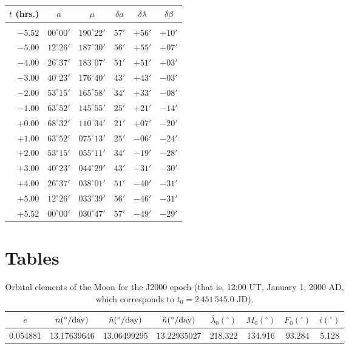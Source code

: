 \begin{center}
\begin{tabular}{r|ccccc}\centering
$t$ (hrs.) & $a $ & $\mu$ & $\delta a $ & $\delta\lambda $ & $\delta\beta$\\\hline
&&&\\[-1.75ex]
$-5.52$ & $00^\circ 00'$  & $190^\circ 22'$ & $57'$ &$+56'$ & $+10'$\\
$-5.00$ & $12^\circ 26'$ & $187^\circ 30'$ & $56'$ & $+55'$ & $+07'$\\
$-4.00$ & $26^\circ  37'$ & $183^\circ 07'$ & $51'$ & $+51'$&$+03'$\\
$-3.00$ & $40^\circ 23'$ & $176^\circ 40'$ & $43'$ &$+43'$ & $-03'$\\
$-2.00$ & $53^\circ 15'$ & $165^\circ 58'$ & $34'$ & $+33'$&$-08'$\\
$-1.00$ & $63^\circ 52'$ & $145^\circ 55'$ & $25'$ & $+21'$&$-14'$\\
$+0.00$ & $68^\circ 32'$ & $110^\circ 34'$ & $21'$ & $+07'$ & $-20'$\\
$+1.00$ & $63^\circ 52'$ & $075^\circ 13'$ & $25'$ & $-06'$&$-24'$\\
$+2.00$ & $53^\circ 15'$ & $055^\circ 11'$ & $34'$ & $-19'$&$-28'$\\
$+3.00$ & $40^\circ 23'$ & $044^\circ 29'$ & $43'$ & $-31'$&$-30'$\\
$+4.00$ & $26^\circ 37'$ & $038^\circ01'$ & $51'$ & $-40'$&$-31'$\\
$+5.00$& $12^\circ 26'$ & $033^\circ 39'$ & $56'$ & $- 46'$&$-31'$\\
$+5.52$ & $00^\circ 00'$ & $030^\circ 47'$ & $57'$ & $-49'$&$-29'$\\
\end{tabular}
\end{center}

\section{Tables}

\begin{table}[h]
{\small\centering
\begin{tabular}{cccccccc}
$e$ & $n(^\circ/{\rm day})$ &  $\tilde{n}(^\circ/{\rm day})$  & $\breve{n}(^\circ/{\rm day})$
& $ \bar{\lambda}_0(^\circ)$ & $M_0(^\circ)$ & $ F_0(^\circ)$ & $i(^\circ)$ \\\hline
0.054881 & 13.17639646 & 13.06499295& $13.22935027$ &
218.322 & 134.916 & 93.284& 5.128\\
\end{tabular}
\caption{Orbital elements of the Moon for the J2000 epoch (that is, 12:00 UT, January 1, 2000 AD,
which corresponds to $t_0 = 2\,451\,545.0$ JD).}\label{tmoon}}
\end{table}

